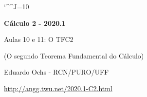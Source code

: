 \documentclass[oneside,12pt]{article}
\begin{document}
\catcode`\^^J=10


\long{}
\long{}
\long{}
\long{}
\long{}
\long{}
\long{}
\long{}
\long{}
\long{}

\long{}
\long{}

\def\frown{\ensuremath{{=}{(}}}
\def\True {\mathbf{V}}
\def\False{\mathbf{F}}

\def\drafturl{http://angg.twu.net/LATEX/2020-1-C2.pdf}
\def\drafturl{http://angg.twu.net/2020.1-C2.html}
\def\draftfooter{\tiny \href{\drafturl}{\jobname{}} \ColorBrown{\shorttoday{} \hours}}



%

\thispagestyle{empty}

\begin{center}

\vspace*{1.2cm}

{\bf \Large Cálculo 2 - 2020.1}

\bsk

Aulas 10 e 11: O TFC2

(O segundo Teorema Fundamental do Cálculo)

\bsk

Eduardo Ochs - RCN/PURO/UFF

\url{http://angg.twu.net/2020.1-C2.html}

\end{center}
\end{document}

